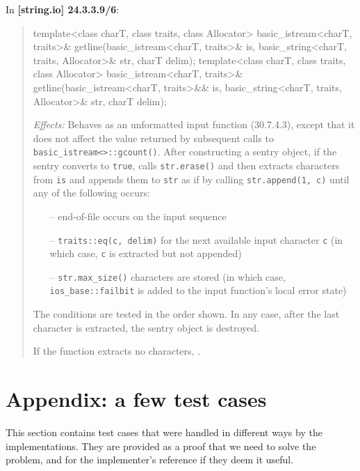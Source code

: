 \documentclass{wg21}
\begin{document}
In \textbf{[string.io] 24.3.3.9/6}:
\begin{quote}
\begin{codeblock}
template<class charT, class traits, class Allocator>
basic_istream<charT, traits>&
  getline(basic_istream<charT, traits>& is,
          basic_string<charT, traits, Allocator>& str,
          charT delim);
template<class charT, class traits, class Allocator>
basic_istream<charT, traits>&
  getline(basic_istream<charT, traits>&& is,
          basic_string<charT, traits, Allocator>& str,
          charT delim);
\end{codeblock}
\textit{Effects:} Behaves as an unformatted input function (30.7.4.3), except
that it does not affect the value returned by subsequent calls to \texttt{basic_istream<>::gcount()}.
After constructing a sentry object, if the sentry converts to \texttt{true},
calls \texttt{str.erase()} and then extracts characters from \texttt{is} and
appends them to \texttt{str} as if by calling \texttt{str.append(1, c)} until
any of the following occurs:
\begin{itemize}
  \item[--] end-of-file occurs on the input sequence\added{;}
  \item[--] \texttt{traits::eq(c, delim)} for the next available input character
            \texttt{c} (in which case, \texttt{c} is extracted but not appended)
  \item[--] \texttt{str.max_size()} characters are stored (in which case,
            {\texttt{ios_base::failbit} is added to the input function's local
            error state})
\end{itemize}
The conditions are tested in the order shown. In any case, after the last
character is extracted, the sentry object is destroyed.

If the function extracts no characters, .
\end{quote}


\section{Appendix: a few test cases}
This section contains test cases that were handled in different ways by the
implementations. They are provided as a proof that we need to solve the problem,
and for the implementer's reference if they deem it useful.
\end{document}
